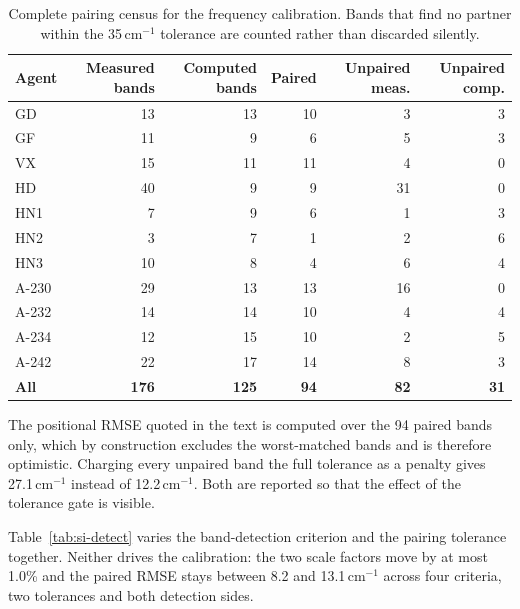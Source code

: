 \documentclass[11pt]{article}
\newcommand*\wn{\ensuremath{\text{cm}^{-1}}}
\begin{document}
\begin{table}[htbp]
\centering
\caption{Complete pairing census for the frequency calibration. Bands that find no partner within the 35\,\wn{} tolerance are counted rather than discarded silently.}
\label{tab:si-census}
\small
\begin{tabular}{lrrrrr}
\toprule
Agent & Measured bands & Computed bands & Paired & Unpaired meas. & Unpaired comp. \\
\midrule
GD & 13 & 13 & 10 & 3 & 3 \\
GF & 11 & 9 & 6 & 5 & 3 \\
VX & 15 & 11 & 11 & 4 & 0 \\
HD & 40 & 9 & 9 & 31 & 0 \\
HN1 & 7 & 9 & 6 & 1 & 3 \\
HN2 & 3 & 7 & 1 & 2 & 6 \\
HN3 & 10 & 8 & 4 & 6 & 4 \\
A-230 & 29 & 13 & 13 & 16 & 0 \\
A-232 & 14 & 14 & 10 & 4 & 4 \\
A-234 & 12 & 15 & 10 & 2 & 5 \\
A-242 & 22 & 17 & 14 & 8 & 3 \\
\textbf{All} & \textbf{176} & \textbf{125} & \textbf{94} & \textbf{82} & \textbf{31} \\
\bottomrule
\end{tabular}

\begin{flushleft}\footnotesize The positional RMSE quoted in the text is computed over the 94 paired bands only, which by construction excludes the worst-matched bands and is therefore optimistic. Charging every unpaired band the full tolerance as a penalty gives 27.1\,\wn{} instead of 12.2\,\wn{}. Both are reported so that the effect of the tolerance gate is visible.\end{flushleft}
\end{table}
\clearpage

Table~\ref{tab:si-detect} varies the band-detection criterion and the pairing tolerance
together. Neither drives the calibration: the two scale factors move by at most 1.0\% and
the paired RMSE stays between 8.2 and 13.1\,\wn{} across four criteria, two tolerances
and both detection sides.
\end{document}
